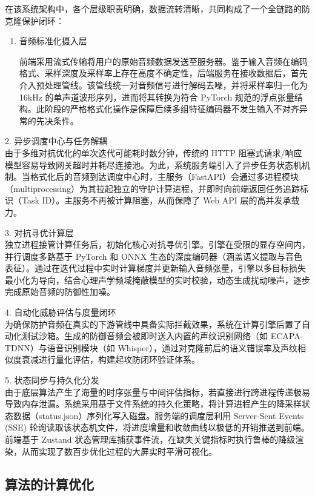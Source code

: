 在该系统架构中，各个层级职责明确，数据流转清晰，共同构成了一个全链路的防克隆保护闭环：

\begin{enumerate}
\def\labelenumi{\arabic{enumi}.}
\item
  音频标准化摄入层

  前端采用流式传输将用户的原始音频数据发送至服务器。鉴于输入音频在编码格式、采样深度及采样率上存在高度不确定性，后端服务在接收数据后，首先介入预处理管线。该管线统一对音频信号进行解码去噪，并将采样率归一化为
  16kHz 的单声道波形序列，进而将其转换为符合 PyTorch
  规范的浮点张量结构。此阶段的严格格式化操作是保障后续多组特征编码器不发生输入不对齐异常的先决条件。
\end{enumerate}

2. 异步调度中心与任务解耦\\
由于多维对抗优化的单次迭代可能耗时数分钟，传统的 HTTP
阻塞式请求/响应模型容易导致网关超时并耗尽连接池。为此，系统服务端引入了异步任务状态机机制。当格式化后的音频到达调度中心时，主服务（FastAPI）会通过多进程模块（multiprocessing）为其拉起独立的守护计算进程，并即时向前端返回任务追踪标识（Task
ID）。主服务不再被计算阻塞，从而保障了 Web API 层的高并发承载力。

3. 对抗寻优计算层\\
独立进程接管计算任务后，初始化核心对抗寻优引擎。引擎在受限的显存空间内，并行调度多路基于
PyTorch 和 ONNX
生态的深度编码器（涵盖语义提取与音色表征）。通过在迭代过程中实时计算梯度并更新输入音频张量，引擎以多目标损失最小化为导向，结合心理声学频域掩蔽模型的实时校验，动态生成扰动噪声，逐步完成原始音频的防御性加噪。

4. 自动化威胁评估与度量闭环\\
为确保防护音频在真实的下游管线中具备实际拦截效果，系统在计算引擎后置了自动化测试沙箱。生成的防御音频会被即时送入内置的声纹识别网络（如
ECAPA-TDNN）与语音识别模块（如
Whisper），通过对克隆前后的语义错误率及声纹相似度衰减进行量化评估，构建起攻防闭环验证体系。

5. 状态同步与持久化分发\\
由于底层算法产生了海量的时序张量与中间评估指标，若直接进行跨进程传递极易导致内存泄漏。系统采用基于文件系统的持久化策略，将计算进程产生的降采样状态数据（status.json）序列化写入磁盘。服务端的调度层利用
Server-Sent Events (SSE)
轮询读取该状态机文件，将进度增量和收敛曲线以极低的开销推送到前端。前端基于
Zustand
状态管理库捕获事件流，在缺失关键指标时执行鲁棒的降级渲染，从而实现了数百步优化过程的大屏实时平滑可视化。

\subsection{算法的计算优化}\label{ux6838ux5fc3ux7b97ux6cd5ux7684ux8d44ux6e90ux7ea6ux675fux4e0eux5e95ux5c42ux4f18ux5316}

